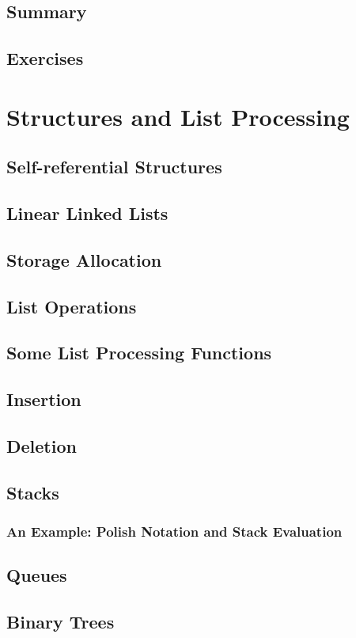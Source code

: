 \documentclass[12pt]{book}
\begin{document}
\section{Summary}
\section{Exercises}

\chapter{Structures and List Processing}

\section{Self-referential Structures}
\section{Linear Linked Lists}
\section{Storage Allocation}
\section{List Operations}
\section{Some List Processing Functions}
\section{Insertion}
\section{Deletion}
\section{Stacks}
\subsection{An Example: Polish Notation and Stack Evaluation}
\section{Queues}
\section{Binary Trees}
\end{document}
